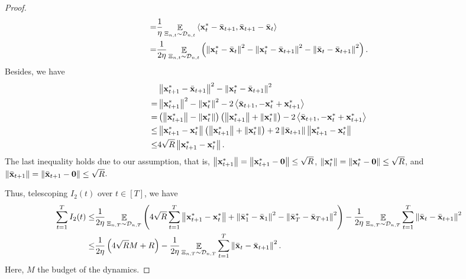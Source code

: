 \documentclass{article}
\begin{document}
\begin{proof}
\begin{align}
= & \frac{1}{\eta}\mathop{\mathbb{E}}_{ \Xi_{n,t} \sim \mathcal{D}_{n,t} }\left\langle {\bf x}_t^\ast - \bar{{\bf x}}_{t+1}, \bar{{\bf x}}_{t+1} - \bar{{\bf x}}_t  \right\rangle \\ \label{equa_I3_temp}
= & \frac{1}{2\eta}\mathop{\mathbb{E}}_{ \Xi_{n,t} \sim \mathcal{D}_{n,t} }\left(  \left\lVert{\bf x}_t^\ast - \bar{{\bf x}}_t\right\rVert^2 - \left\lVert{\bf x}_t^\ast - \bar{{\bf x}}_{t+1}\right\rVert^2 - \left\lVert\bar{{\bf x}}_t - \bar{{\bf x}}_{t+1}\right\rVert^2  \right). 
\end{align} Besides, we have
\begin{align}
\nonumber
& \left\lVert{\bf x}_{t+1}^\ast - \bar{{\bf x}}_{t+1}\right\rVert^2 - \left\lVert{\bf x}_t^\ast - \bar{{\bf x}}_{t+1}\right\rVert^2 \\ \nonumber 
= & \left\lVert{\bf x}_{t+1}^\ast\right\rVert^2 - \left\lVert{\bf x}_t^\ast\right\rVert^2 - 2\left\langle\bar{{\bf x}}_{t+1}, -{\bf x}_t^\ast + {\bf x}_{t+1}^\ast \right\rangle \\ \nonumber
= & \left( \left\lVert{\bf x}_{t+1}^\ast\right\rVert - \left\lVert{\bf x}_t^\ast\right\rVert \right) \left( \left\lVert{\bf x}_{t+1}^\ast\right\rVert + \left\lVert{\bf x}_t^\ast\right\rVert \right) - 2\left\langle\bar{{\bf x}}_{t+1}, -{\bf x}_t^\ast + {\bf x}_{t+1}^\ast \right\rangle \\ \nonumber
\le & \left\lVert{\bf x}_{t+1}^\ast - {\bf x}_t^\ast\right\rVert \left( \left\lVert{\bf x}_{t+1}^\ast\right\rVert + \left\lVert{\bf x}_t^\ast\right\rVert \right) + 2\left\lVert\bar{{\bf x}}_{t+1}\right\rVert \left\lVert{\bf x}_{t+1}^\ast-{\bf x}_t^\ast\right\rVert \\ \nonumber
\le & 4\sqrt{R}\left\lVert{\bf x}_{t+1}^\ast - {\bf x}_t^\ast\right\rVert.   
\end{align} The last inequality holds due to our assumption, that is, $\left\lVert{\bf x}_{t+1}^\ast\right\rVert=\left\lVert{\bf x}_{t+1}^\ast - {\bf 0}\right\rVert\le \sqrt{R}$, $\left\lVert{\bf x}_t^\ast\right\rVert = \left\lVert{\bf x}_t^\ast-{\bf 0}\right\rVert \le \sqrt{R}$, and $\left\lVert\bar{{\bf x}}_{t+1}\right\rVert = \left\lVert\bar{{\bf x}}_{t+1}-{\bf 0}\right\rVert \le \sqrt{R}$. 

Thus, telescoping $I_2(t)$ over $t\in[T]$, we have 
\begin{align}
\nonumber
\sum_{t=1}^T I_2(t) \le & \frac{1}{2\eta}\mathop{\mathbb{E}}_{ \Xi_{n,T} \sim \mathcal{D}_{n,T} }\left(  4\sqrt{R}\sum_{t=1}^T\left\lVert{\bf x}_{t+1}^\ast - {\bf x}_t^\ast\right\rVert + \left\lVert\bar{{\bf x}}_1^\ast - \bar{{\bf x}}_1\right\rVert^2 - \left\lVert\bar{{\bf x}}_T^\ast - \bar{{\bf x}}_{T+1}\right\rVert^2  \right) - \frac{1}{2\eta} \mathop{\mathbb{E}}_{ \Xi_{n,T} \sim \mathcal{D}_{n,T} }\sum_{t=1}^T \left\lVert\bar{{\bf x}}_t - \bar{{\bf x}}_{t+1}\right\rVert^2 \\ \nonumber
\le & \frac{1}{2\eta}\left(  4\sqrt{R} M + R  \right) - \frac{1}{2\eta} \mathop{\mathbb{E}}_{ \Xi_{n,T} \sim \mathcal{D}_{n,T} } \sum_{t=1}^T \left\lVert\bar{{\bf x}}_t - \bar{{\bf x}}_{t+1} \right\rVert^2.
\end{align} Here, $M$ the budget of the dynamics.


\end{proof}
\end{document}

